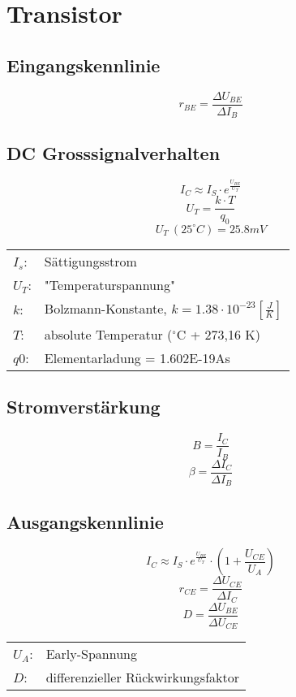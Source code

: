 



\newpage
\section{Transistor}

\subsection{Eingangskennlinie}
\[ r_{BE} = \frac{\Delta U_{BE}}{\Delta I_B} \]

\subsection{DC Grosssignalverhalten}
\[ I_C \approx I_S \cdot e^{\frac{U_{BE}}{U_T}}\]
\[ U_T= \frac{k \cdot T}{q_0} \]
\[ U_T~(25^\circ C) = 25.8 mV \]
\begin{tabular}{@{}ll}
  $I_s$:        & Sättigungsstrom \\
  $U_T$:	    & "Temperaturspannung" \\
  $k$:          & Bolzmann-Konstante, $k=1.38 \cdot 10^{-23} [\frac{J}{K}]$ \\
  $T$:          & absolute Temperatur ($^\circ$C + 273,16 K) \\
  $q0$:         & Elementarladung = 1.602E-19As \\
\end{tabular}

\subsection{Stromverstärkung}
\[ B = \frac{I_C}{I_B} \]
\[ \beta = \frac{\Delta I_C}{\Delta I_B} \]

\subsection{Ausgangskennlinie}
\[ I_C \approx I_S \cdot e^{\frac{U_{BE}}{U_T}} \cdot 
\left(1 + \frac{U_{CE}}{U_A}\right) \]
\[ r_{CE} = \frac{\Delta U_{CE}}{\Delta I_C} \]
\[ D = \frac{\Delta U_{BE}}{\Delta U_{CE}} \]
\begin{tabular}{@{}ll}
  $U_A$:	    & Early-Spannung \\
  $D$:	        & differenzieller Rückwirkungsfaktor \\
\end{tabular}

